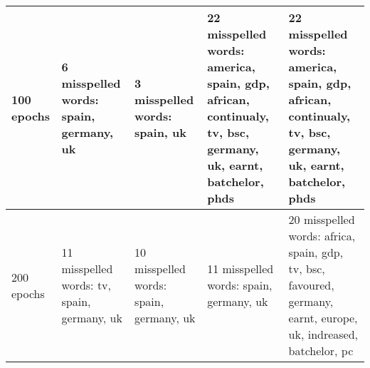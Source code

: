 \documentclass[]{article}
\begin{document}
\begin{landscape}
\begin{longtable}{|p{20mm}|p{50mm}|p{50mm}|p{50mm}|p{50mm}|}
100 epochs &6 misspelled words: spain, germany, uk & 3 misspelled words: spain, uk & 22 misspelled words: america, spain, gdp, african, continualy, tv, bsc, germany, uk, earnt, batchelor, phds & 22 misspelled words: america, spain, gdp, african, continualy, tv, bsc, germany, uk, earnt, batchelor, phds\\ \hline 
200 epochs &11 misspelled words: tv, spain, germany, uk & 10 misspelled words: spain, germany, uk & 11 misspelled words: spain, germany, uk & 20 misspelled words: africa, spain, gdp, tv, bsc, favoured, germany, earnt, europe, uk, indreased, batchelor, pc\\ \hline 
\end{longtable}
    \end{landscape}
    
\end{document}
